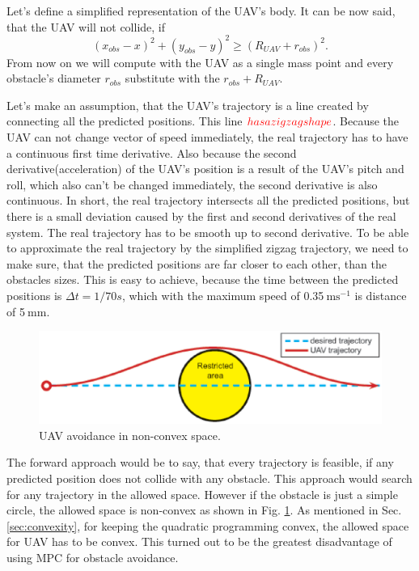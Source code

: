 \documentclass[a4paper,11pt,titlepage]{article}
\newcommand{\jed}[1]{\ensuremath{~\mathrm{#1}}}
\begin{document}
Let's define a simplified representation of the UAV's body. It can be now said, that the UAV will not collide, if 
\begin{equation}
(x_{obs} - x)^2 + (y_{obs} - y)^2 \geq (R_{UAV} + r_{obs})^2.
\end{equation}
From now on we will compute with the UAV as a single mass point and every obstacle's diameter $r_{obs}$ substitute with the $r_{obs} + R_{UAV}$.	 

Let's make an assumption, that the UAV's trajectory is a line created by connecting all the predicted positions. This line $\textcolor{red}{has a zigzag shape}$. Because the UAV can not change vector of speed immediately, the real trajectory has to have a continuous first time derivative. Also because the second derivative(acceleration) of the UAV's position is a result of the UAV's pitch and roll, which also can't be changed immediately, the second derivative is also continuous. In short, the real trajectory intersects all the predicted positions, but there is a small deviation caused by the first and second derivatives of the real system. The real trajectory has to be smooth up to second derivative. To be able to approximate the real trajectory by the simplified zigzag trajectory, we need to make sure, that the predicted positions are far closer to each other, than the obstacles sizes. This is easy to achieve, because the time between the predicted positions is $\Delta t = 1/70s$, which with the maximum speed of 0.35\jed{ms^{-1}} is distance of 5\jed{mm}.

\begin{figure}[h]
\centering
\includegraphics[width=1\textwidth]{fig/perfect_collision_avoidance_arrow.eps} 
\caption{UAV avoidance in non-convex space.}
\label{fig:perfect_collision_avoidance}
\end{figure}

The forward approach would be to say, that every trajectory is feasible, if any predicted position does not collide with any obstacle. This approach would search for any trajectory in the allowed space. However if the obstacle is just a simple circle, the allowed space is non-convex as shown in Fig. \ref{fig:perfect_collision_avoidance}. As mentioned in Sec.  \ref{sec:convexity}, for keeping the quadratic programming convex, the allowed space for UAV has to be convex. This turned out to be the greatest disadvantage of using MPC for obstacle avoidance. 
\end{document}
